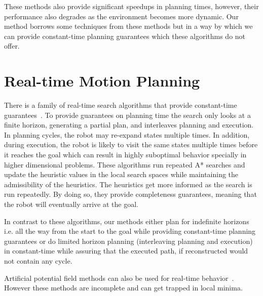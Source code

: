 \documentclass[a4paper]{report}
\begin{document}
These methods also provide significant speedups in planning times, however, their performance also degrades as the environment becomes more dynamic. Our method borrows some techniques from these methods but in a way by which we can provide constant-time planning guarantees which these algorithms do not offer.

\section{Real-time Motion Planning}
\label{rel:real}
There is a family of real-time search algorithms that provide constant-time guarantees~\cite{KL06,KS09,K90,bjornsson2009tba}.
	To provide guarantees on planning time the search only looks at a finite horizon, generating a partial plan, and interleaves planning and execution. In planning cycles, the robot may re-expand states multiple times. In addition, during execution, the robot is likely to visit the same states multiple times before it reaches the goal which can result in highly suboptimal behavior specially in higher dimensional problems. These algorithms run repeated A* searches and update the heuristic values in the local search spaces while maintaining the admissibility of the heuristics. The heuristics get more informed as the search is run repeatedly. By doing so, they provide completeness guarantees, meaning that the robot will eventually arrive at the goal.

In contrast to these algorithms, our methods either plan for indefinite horizons i.e. all the way from the start to the goal while providing constant-time planning guarantees or do limited horizon planning (interleaving planning and execution) in constant-time while assuring that the executed path, if reconstructed would not contain any cycle.

Artificial potential field methods can also be used for real-time behavior~\cite{warren1989global,vadakkepat2000evolutionary}. However these methods are incomplete and can get trapped in local minima.
\end{document}
